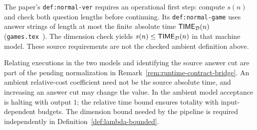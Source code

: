 \begin{remark}
\label{rem:source-normal-verifier}
The paper's \texttt{def:normal-ver} requires an operational first step: compute $s(n)$
and check both question lengths before continuing. Its \texttt{def:normal-game} uses
answer strings of length at most the finite absolute time $\mathsf{TIME}_{\mathcal{D}}(n)$
(\texttt{games.tex}~\cite{AuditSync26}). The dimension check yields
$s(n)\leq\mathsf{TIME}_{\mathcal{D}}(n)$ in that machine model. These source requirements are not
the checked ambient definition above.

Relating executions in the two models and identifying the source answer cut are part of
the pending normalization in Remark~\ref{rem:runtime-contract-bridge}. An ambient
relative-cost coefficient need not be the source absolute time, and increasing an answer
cut may change the value. In the ambient model acceptance is halting with output $1$;
the relative time bound ensures totality with input-dependent budgets. The dimension bound
needed by the pipeline is required independently in Definition~\ref{def:lambda-bounded}.
\end{remark}

